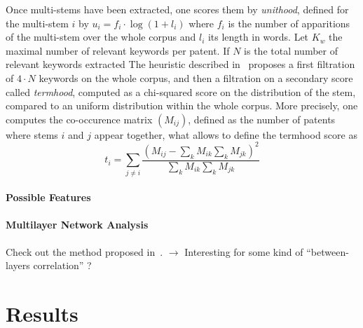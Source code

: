 Once multi-stems have been extracted, one scores them by \emph{unithood}, defined for the multi-stem $i$ by $u_i = f_i\cdot \log{(1 + l_i)}$ where $f_i$ is the number of apparitions of the multi-stem over the whole corpus and $l_i$ its length in words. Let $K_w$ the maximal number of relevant keywords per patent. If $N$ is the total number of relevant keywords extracted 
The heuristic described in~\cite{chavalarias2013phylomemetic} proposes a first filtration of $4\cdot N$ keywords on the whole corpus, and then a filtration on a secondary score called \emph{termhood}, computed as a chi-squared score on the distribution of the stem, compared to an uniform distribution within the whole corpus. More precisely, one computes the co-occurence matrix $(M_{ij})$, defined as the number of patents where stems $i$ and $j$ appear together, what allows to define the termhood score as
\[
t_i = \sum_{j\neq i}\frac{\left( M_{ij} - \sum_{k}M_{ik} \sum_{k} M_{jk}\right)^2}{\sum_{k}M_{ik} \sum_{k} M_{jk}}
\]




\paragraph{Possible Features}






\paragraph{Multilayer Network Analysis}
Check out the method proposed in~\cite{iacovacci2015mesoscopic}. $\rightarrow$ Interesting for some kind of ``between-layers correlation'' ?








\section{Results}

















